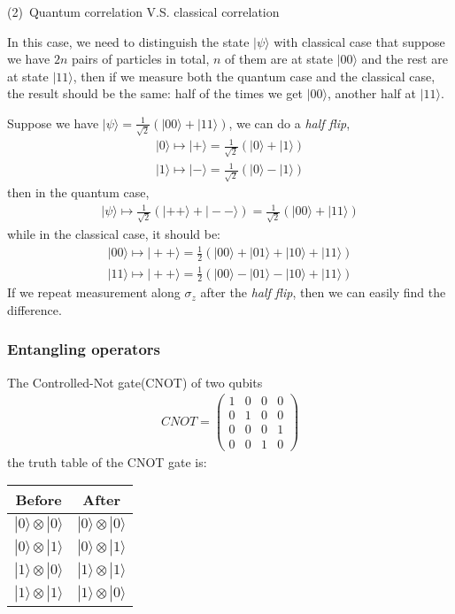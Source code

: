 \documentclass[UTF8,12pt]{article} %
\begin{document}
(2)~Quantum correlation V.S. classical correlation

In this case, we need to distinguish the state $|\psi\rangle$ with classical case that suppose we have $2n$ pairs of particles in total, $n$ of them are at state $|00\rangle$ and the rest are at state $|11\rangle$, then if we measure both the quantum case and the classical case, the result should be the same: half of the times we get $|00\rangle$, another half at $|11\rangle$.

Suppose we have $|\psi\rangle = \frac{1}{\sqrt{2}}\left(|00\rangle + |11\rangle\right)$, we can do a \textit{half flip},
\begin{align}
|0\rangle\longmapsto|+\rangle = \frac{1}{\sqrt{2}}(|0\rangle+|1\rangle)\\
|1\rangle\longmapsto|-\rangle = \frac{1}{\sqrt{2}}(|0\rangle-|1\rangle)
\end{align}
then in the quantum case,
\begin{align}
|\psi\rangle\longmapsto \frac{1}{\sqrt{2}}\left(|++\rangle + |--\rangle\right) = \frac{1}{\sqrt{2}}(|00\rangle + |11\rangle)
\end{align}
while in the classical case, it should be:
\begin{align}
|00\rangle\longmapsto |++\rangle = \frac{1}{2}(|00\rangle + |01\rangle + |10\rangle + |11\rangle) \\
|11\rangle\longmapsto |++\rangle = \frac{1}{2}(|00\rangle - |01\rangle - |10\rangle + |11\rangle)
\end{align}
If we repeat measurement along $\sigma_{z}$ after the \textit{half flip}, then we can easily find the difference.

\subsubsection{Entangling operators}
The Controlled-Not gate(CNOT) of two qubits
\begin{align}
CNOT = \begin{pmatrix}1&0&0&0\\0&1&0&0\\0&0&0&1\\0&0&1&0\end{pmatrix}
\end{align}
the truth table of the CNOT gate is:
\begin{table}[H]\centering
\begin{tabular}{|c|c|}\hline
Before&After\\ \hline
$|0\rangle\otimes|0\rangle$ & $|0\rangle\otimes|0\rangle$\\ \hline
$|0\rangle\otimes|1\rangle$ & $|0\rangle\otimes|1\rangle$\\ \hline
$|1\rangle\otimes|0\rangle$ & $|1\rangle\otimes|1\rangle$\\ \hline
$|1\rangle\otimes|1\rangle$ & $|1\rangle\otimes|0\rangle$\\ \hline
\end{tabular}
\end{table}
\end{document}
